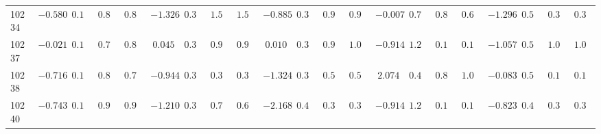 \documentclass[6pt]{article}
\begin{document}
\begin{landscape}
{\begin{longtable}{lrrrrrrrrrrrrrrrrrrrr}
10234&$-0.580$&$0.167$&$0.808$&$0.818$&$-1.326$&$0.343$&$1.571$&$1.543$&$-0.885$&$0.332$&$0.978$&$0.983$&$-0.007$&$0.714$&$0.866$&$0.660$&$-1.296$&$0.509$&$0.326$&$0.334$\tabularnewline
10237&$-0.021$&$0.182$&$0.792$&$0.859$&$ 0.045$&$0.393$&$0.988$&$0.961$&$ 0.010$&$0.363$&$0.999$&$1.060$&$-0.914$&$1.254$&$0.135$&$0.149$&$-1.057$&$0.501$&$1.059$&$1.029$\tabularnewline
10238&$-0.716$&$0.166$&$0.825$&$0.771$&$-0.944$&$0.376$&$0.330$&$0.302$&$-1.324$&$0.346$&$0.586$&$0.541$&$ 2.074$&$0.423$&$0.873$&$1.001$&$-0.083$&$0.547$&$0.104$&$0.101$\tabularnewline
10240&$-0.743$&$0.166$&$0.948$&$0.943$&$-1.210$&$0.352$&$0.707$&$0.686$&$-2.168$&$0.453$&$0.379$&$0.357$&$-0.914$&$1.254$&$0.135$&$0.149$&$-0.823$&$0.499$&$0.391$&$0.391$\tabularnewline
\hline
\end{longtable}}\end{landscape}
\end{document}
